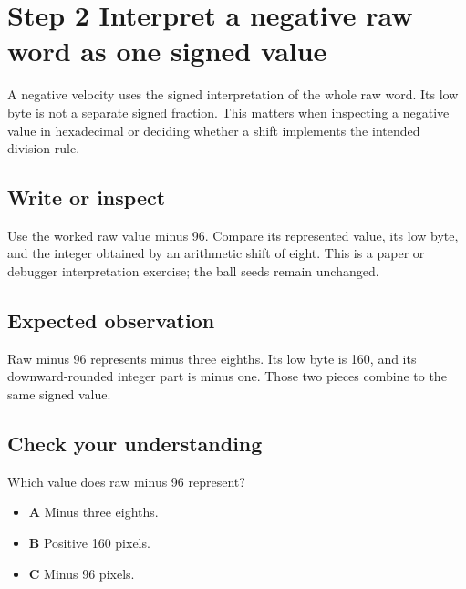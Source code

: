 \section{Step 2 Interpret a negative raw word as one signed value}\label{ball-s02}

A negative velocity uses the signed interpretation of the whole raw word. Its low byte is not a separate signed fraction. This matters when inspecting a negative value in hexadecimal or deciding whether a shift implements the intended division rule.

\subsection{Write or inspect}
Use the worked raw value minus 96. Compare its represented value, its low byte, and the integer obtained by an arithmetic shift of eight. This is a paper or debugger interpretation exercise; the ball seeds remain unchanged.

\subsection{Expected observation}
Raw minus 96 represents minus three eighths. Its low byte is 160, and its downward-rounded integer part is minus one. Those two pieces combine to the same signed value.

\subsection{Check your understanding}
Which value does raw minus 96 represent?

\begin{itemize}
  \item \textbf{A} Minus three eighths.
  \item \textbf{B} Positive 160 pixels.
  \item \textbf{C} Minus 96 pixels.
\end{itemize}
